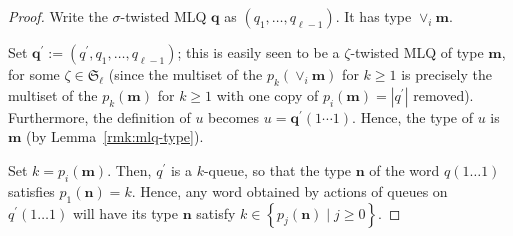 \documentclass[reqno]{amsart}%
\newcommand{\0}{\phantom{c}}
\newcommand{\merge}[1]{\vee_{#1}}
\newcommand{\SymGp}[1]{\mathfrak{S}_{#1}}
\newcommand{\mm}{\mathbf{m}}
\newcommand{\set}[1]{\left\{ #1 \right\}}
\newcommand{\tup}[1]{\left( #1 \right)}
\theoremstyle{plain}
\theoremstyle{definition}
\numberwithin{equation}{section}
\begin{document}
\begin{proof}
\begin{comment}
Let us first show an auxiliary observation.
Let $q$, $u$ and $t$ be as in Remark~\ref{rmk:t-splitting},
and let $h \in \set{1, 2, \ldots}$.
The permutation $\tup{i_1, i_2, \ldots, i_n}$ in the construction of $q(u)$
also works for the construction of $q(\merge{h} u)$,
since $(\merge{h} u)_a \leq (\merge{h} u)_b$ whenever $u_a \leq u_b$.
Thus, the construction of $q(\merge{h} u)$ proceeds exactly as the
construction of $q(u)$, except that the letters used to build
the former word are those of $\merge{h} u$ instead of those of $u$.
This yields an expression for each letter $(q(\merge{h} u))_i$ of
$q(\merge{h} u)$ depending on whether ...
\begin{equation}
q(\merge{h} u) = \begin{cases}
\merge{h} q(u) , & \text{ if } h < t ; \\
\merge{h+1} q(u) , & \text{ if } h \geq t
\end{cases} .
\label{pf.lemma:queue_merge.1}
\end{equation}
\end{comment}
Write the $\sigma$-twisted MLQ $\mathbf{q}$ as $\left(  q_{1}, \ldots,
q_{\ell-1} \right)  $. It has type $\vee_{i} \mathbf{m}$.



Set $\mathbf{q}^{\prime}:= \left(  q^{\prime}, q_{1}, \ldots, q_{\ell-1}
\right)  $; this is easily seen to be a $\zeta$-twisted MLQ of type
$\mathbf{m}$, for some $\zeta\in\mathfrak{S}_{\ell}$ (since the multiset of
the $p_{k}(\vee_{i}\mathbf{m})$ for $k \geq1$ is precisely the multiset of the
$p_{k}(\mathbf{m})$ for $k \geq1$ with one copy of $p_{i}(\mathbf{m}) =
\left|  q^{\prime}\right|  $ removed). Furthermore, the definition of $u$
becomes $u = \mathbf{q}^{\prime}(1 \dotsm1)$. Hence, the type of $u$ is
$\mathbf{m}$ (by Lemma~\ref{rmk:mlq-type}).

Set $k = p_{i}(\mathbf{m})$. Then, $q^{\prime}$ is a $k$-queue, so that the
type $\mathbf{n}$ of the word $q(1 \dots1)$ satisfies $p_{1}(\mathbf{n}) = k$.
Hence, any word obtained by actions of queues on $q^{\prime}(1 \dots1)$ will
have its type $\mathbf{n}$ satisfy $k \in\left\{  p_{j}(\mathbf{n}) \mid j
\geq0 \right\}  $.


\end{proof}
\end{document}
